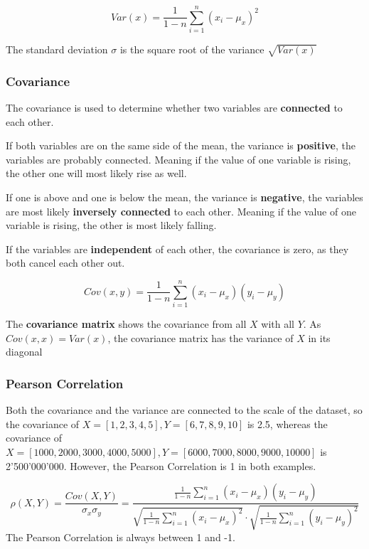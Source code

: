 \documentclass[11pt]{article}
\begin{document}
\begin{equation}
    Var(x) = \frac{1}{1-n} \sum^{n}_{i=1}(x_{i} - \mu_x)^2
\end{equation}

The standard deviation $\sigma$ is the square root of the variance $\sqrt{Var(x)}$

\newpage

\subsubsection{Covariance} \label{sec:covariance}
The covariance is used to determine whether two variables are \textbf{connected} to each other.

If both variables are on the same side of the mean, the variance is \textbf{positive}, the variables are probably connected. Meaning if the value of one variable is rising, the other one will most likely rise as well.

If one is above and one is below the mean, the variance is \textbf{negative}, the variables are most likely \textbf{inversely connected} to each other. Meaning if the value of one variable is rising, the other is most likely falling.

If the variables are \textbf{independent} of each other, the covariance is zero, as they both cancel each other out.

\begin{equation}
    Cov(x,y) = \frac{1}{1-n} \sum^{n}_{i=1}(x_{i} - \mu_x)(y_{i} - \mu_y)
\end{equation}

The \textbf{covariance matrix} shows the covariance from all $X$ with all $Y$. As $Cov(x,x) = Var(x)$, the covariance matrix has the variance of $X$ in its diagonal


\subsubsection{Pearson Correlation} \label{sec:pearson}
Both the covariance and the variance are connected to the scale of the dataset, so the covariance of $X=[1,2,3,4,5] , Y=[6,7,8,9,10]$ is 2.5, whereas the covariance of $X=[1000,2000,3000,\allowbreak 4000,5000],\allowbreak Y=[6000,7000,8000,9000,10000]$ is 2'500'000'000. However, the Pearson Correlation is 1 in both examples.

\begin{equation}
    \rho(X,Y)=\frac{Cov(X,Y)}{\sigma_{x} \sigma_{y}} =
    \frac{\frac{1}{1-n} \sum^{n}_{i=1}(x_{i} - \mu_x)(y_{i} - \mu_y)}{\sqrt{\frac{1}{1-n} \sum^{n}_{i=1}(x_{i} - \mu_x)^2} \cdot \sqrt{\frac{1}{1-n} \sum^{n}_{i=1}(y_{i} - \mu_y)^2}}
\end{equation}
The Pearson Correlation is always between 1 and -1.
\end{document}
